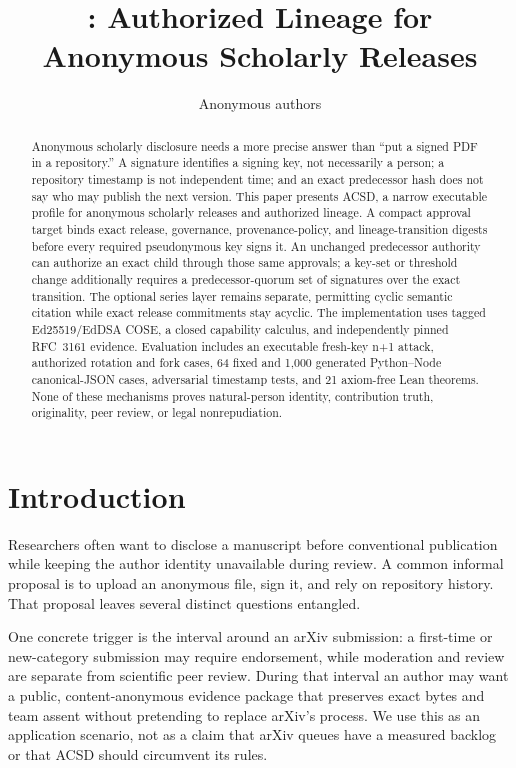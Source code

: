 \documentclass[11pt]{article}
\title{\acsd: Authorized Lineage for Anonymous Scholarly Releases}
\author{Anonymous authors}
\date{}
\newcommand{\acsd}{\textsc{ACSD}}
\begin{document}
\maketitle

\begin{abstract}
Anonymous scholarly disclosure needs a more precise answer than ``put a signed PDF in a repository.'' A signature identifies a signing key, not necessarily a person; a repository timestamp is not independent time; and an exact predecessor hash does not say who may publish the next version. This paper presents \acsd, a narrow executable profile for anonymous scholarly releases and authorized lineage. A compact approval target binds exact release, governance, provenance-policy, and lineage-transition digests before every required pseudonymous key signs it. An unchanged predecessor authority can authorize an exact child through those same approvals; a key-set or threshold change additionally requires a predecessor-quorum set of signatures over the exact transition. The optional series layer remains separate, permitting cyclic semantic citation while exact release commitments stay acyclic. The implementation uses tagged Ed25519/EdDSA COSE, a closed capability calculus, and independently pinned RFC~3161 evidence. Evaluation includes an executable fresh-key n+1 attack, authorized rotation and fork cases, 64 fixed and 1,000 generated Python--Node canonical-JSON cases, adversarial timestamp tests, and 21 axiom-free Lean theorems. None of these mechanisms proves natural-person identity, contribution truth, originality, peer review, or legal nonrepudiation.
\end{abstract}

\section{Introduction}

Researchers often want to disclose a manuscript before conventional publication while keeping the author identity unavailable during review. A common informal proposal is to upload an anonymous file, sign it, and rely on repository history. That proposal leaves several distinct questions entangled.

One concrete trigger is the interval around an arXiv submission: a first-time or
new-category submission may require endorsement, while moderation and review
are separate from scientific peer review. During that interval an author may
want a public, content-anonymous evidence package that preserves exact bytes
and team assent without pretending to replace arXiv's process. We use this as
an application scenario, not as a claim that arXiv queues have a measured
backlog or that ACSD should circumvent its rules.
\end{document}
